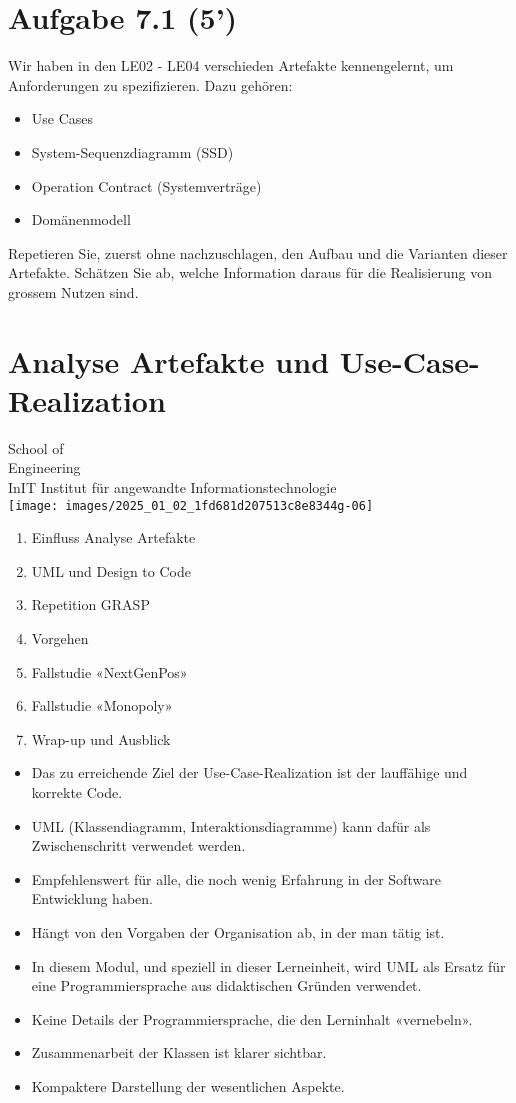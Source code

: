 \documentclass[10pt]{article}
\begin{document}
\section*{Aufgabe 7.1 (5’)}
Wir haben in den LE02 - LE04 verschieden Artefakte kennengelernt, um Anforderungen zu spezifizieren. Dazu gehören:

\begin{itemize}
  \item Use Cases
  \item System-Sequenzdiagramm (SSD)
  \item Operation Contract (Systemverträge)
  \item Domänenmodell
\end{itemize}

Repetieren Sie, zuerst ohne nachzuschlagen, den Aufbau und die Varianten dieser Artefakte. Schätzen Sie ab, welche Information daraus für die Realisierung von grossem Nutzen sind.

\section*{Analyse Artefakte und Use-Case-Realization}
School of\\
Engineering\\
InIT Institut für angewandte Informationstechnologie\\
\texttt{[image: images/2025\_01\_02\_1fd681d207513c8e8344g-06]}

\begin{enumerate}
  \item Einfluss Analyse Artefakte
  \item UML und Design to Code
  \item Repetition GRASP
  \item Vorgehen
  \item Fallstudie «NextGenPos»
  \item Fallstudie «Monopoly»
  \item Wrap-up und Ausblick
\end{enumerate}

\begin{itemize}
  \item Das zu erreichende Ziel der Use-Case-Realization ist der lauffähige und korrekte Code.
  \item UML (Klassendiagramm, Interaktionsdiagramme) kann dafür als Zwischenschritt verwendet werden.
  \item Empfehlenswert für alle, die noch wenig Erfahrung in der Software Entwicklung haben.
  \item Hängt von den Vorgaben der Organisation ab, in der man tätig ist.
  \item In diesem Modul, und speziell in dieser Lerneinheit, wird UML als Ersatz für eine Programmiersprache aus didaktischen Gründen verwendet.
  \item Keine Details der Programmiersprache, die den Lerninhalt «vernebeln».
  \item Zusammenarbeit der Klassen ist klarer sichtbar.
  \item Kompaktere Darstellung der wesentlichen Aspekte.
\end{itemize}
\end{document}
